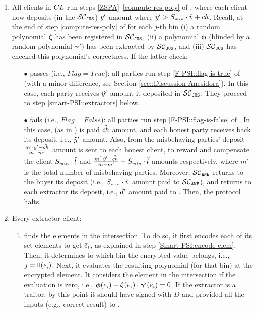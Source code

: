 \begin{enumerate}
\item\label{e-psi::invoke-remainer-F-PSI} All clients in ${CL}$   run steps \ref{ZSPA}--\ref{compute-res-poly} of \fpsi, where each client now deposits (in the $\mathcal{SC}_{\mathtt{JUS}}$) $\ddot{y}'$ amount where $\ddot{y}'>S_{\scriptscriptstyle min}\cdot \ddot{v}+{\ddot{ch}}$. Recall, at the end of step \ref{compute-res-poly}  of \fpsi for each $j$-th bin (i) a random polynomial $\bm\zeta$ has been registered in $\mathcal{SC}_{\mathtt{JUS}}$, (ii) a polynomial $\bm\phi$ (blinded by a random polynomial $\bm\gamma'$) has been extracted by $\mathcal{SC}_{\mathtt{JUS}}$, and (iii) $\mathcal{SC}_{\mathtt{JUS}}$  has checked this polynomial's  correctness. If the latter check:

\begin{itemize}
\item[$\bullet$] passes (i.e., $Flag=True$): all parties run step \ref{F-PSI::flag-is-true} of \fpsi (with a minor difference, see Section \ref{sec::Discussion-Anesidora}).  In this case, each party receives $\ddot{y}'$ amount it deposited in $\mathcal{SC}_{\mathtt{JUS}}$. They proceed to step \ref{smart-PSI::extractors} below.
\item[$\bullet$]  fails (i.e., $Flag=False$): all parties run step \ref{F-PSI::flag-is-false}  of \fpsi. In this case,
(as in \fpsi) \aud is paid $\ddot{ch}$ amount, and each honest party receives back its deposit, i.e., $\ddot{y}'$ amount. Also,  from the misbehaving parties' deposit  $\frac{m'\cdot \ddot{y}'-\ddot{ch}}{m-m'}$ amount is sent to each honest client,  to reward and compensate the client $S_{\scriptscriptstyle min}\cdot \ddot{l}$ and $\frac{m'\cdot \ddot{y}'-\ddot{ch}}{m-m'}- S_{\scriptscriptstyle min}\cdot \ddot{l}$ amounts respectively, where $m'$ is the total number of misbehaving parties.  Moreover, $\mathcal{SC}_{\mathtt{ANE}}$ returns to the buyer its deposit (i.e., $S_{\scriptscriptstyle min}\cdot \ddot{v}$ amount paid to $\mathcal{SC}_{\mathtt{ANE}}$), and returns to each extractor its deposit, i.e., $\ddot{d}'$ amount paid to \SCpc. Then, the protocol halts. 
\end{itemize}

\item\label{smart-PSI::extractors} Every extractor client: 
\begin{enumerate}

\item finds the elements in the intersection. To do so, it first encodes each of its set elements to get $\bar e_{\scriptscriptstyle i}$, as explained in step \ref{Smart-PSI:encode-elem}.  
%
 Then, it determines to which bin the encrypted value belongs, i.e., ${ {  {j}}}=\mathtt{H}( \bar{e}_{\scriptscriptstyle i})$. Next, it evaluates the resulting polynomial (for that bin) at the encrypted element. It considers the element in the intersection if the evaluation is zero, i.e., $\bm\phi( \bar{e}_{\scriptscriptstyle i})-\bm\zeta( \bar{e}_{\scriptscriptstyle i})\cdot \bm\gamma'( \bar{e}_{\scriptscriptstyle i})=0$. If the extractor is a traitor, by this point it should have signed \SCtc with $ { D}$ and provided all the inputs (e.g., correct result) to \SCtc. 


\end{enumerate}
\end{enumerate}
